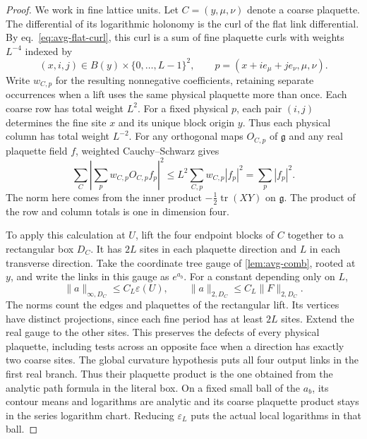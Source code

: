 \documentclass[11pt,letterpaper,reqno]{amsart}
\numberwithin{equation}{section}
\renewcommand{\eqref}[1]{\textup{eq.~\ref{#1}}}
\theoremstyle{definition}
\theoremstyle{remark}
\begin{document}
\begin{proof}
We work in fine lattice units. Let \(C=(y,\mu,\nu)\) denote a coarse
plaquette. The differential of its logarithmic holonomy is the curl
of the flat link differential. By \eqref{eq:avg-flat-curl}, this curl is
a sum of fine plaquette curls with weights \(L^{-4}\) indexed by
\[
 (x,i,j)\in B(y)\times\{0,\ldots,L-1\}^2,\qquad
 p=(x+ie_\mu+je_\nu,\mu,\nu).
\]
Write \(w_{C,p}\) for the resulting nonnegative coefficients,
retaining separate occurrences when a lift uses the same physical
plaquette more than once. Each coarse row has total weight \(L^2\).
For a fixed physical \(p\), each pair \((i,j)\) determines the fine
site \(x\) and its unique block origin \(y\). Thus each physical
column has total weight \(L^{-2}\). For any orthogonal maps \(O_{C,p}\)
of \(\mathfrak g\) and any real plaquette field \(f\), weighted
Cauchy--Schwarz gives
\begin{equation}\label{eq:energy-schur}
 \sum_C\left|\sum_p w_{C,p}O_{C,p}f_p\right|^2
 \le L^2\sum_{C,p}w_{C,p}|f_p|^2
 =\sum_p |f_p|^2.
\end{equation}
The norm here comes from the inner product
\(-\tfrac12\operatorname{tr}(XY)\) on \(\mathfrak g\). The product
of the row and column totals is one in dimension four.

To apply this calculation at \(U\), lift the four endpoint blocks
of \(C\) together to a rectangular box \(D_C\). It has \(2L\)
sites in each plaquette direction and \(L\) in each transverse
direction. Take the coordinate tree gauge
of \cref{lem:avg-comb}, rooted at \(y\), and write the links in
this gauge as \(e^{a_b}\). For a constant depending only on \(L\),
\[
 \|a\|_{\infty,D_C}\le C_L\varepsilon(U),\qquad
 \|a\|_{2,D_C}\le C_L\|F\|_{2,D_C}.
\]
The norms count the edges and plaquettes of the rectangular
lift. Its vertices have distinct projections, since each
fine period has at least \(2L\) sites. Extend the real gauge
to the other sites. This preserves the defects of every
physical plaquette, including tests across an opposite face
when a direction has exactly two coarse sites. The global
curvature hypothesis puts all four output links in the first
real branch. Thus their plaquette product is the one obtained
from the analytic path formula in the literal box. On a fixed
small ball of the \(a_b\), its contour means and logarithms are
analytic and its coarse plaquette product stays in the series
logarithm chart. Reducing \(\varepsilon_L\) puts the actual
local logarithms in that ball.


\end{proof}
\end{document}
